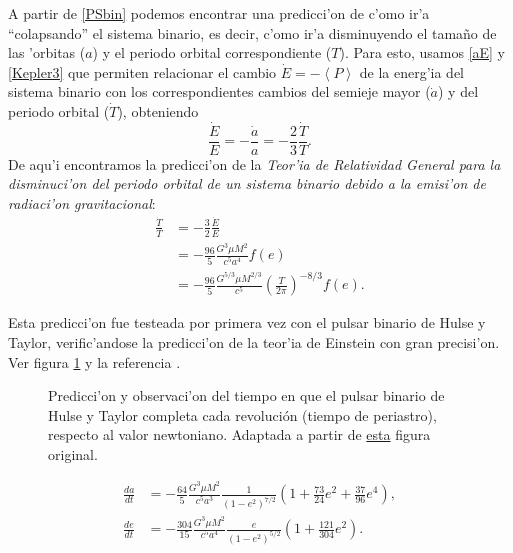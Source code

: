 A partir de \eqref{PSbin} podemos encontrar una predicci'on de c'omo ir'a ``colapsando'' el sistema binario, es decir, c'omo ir'a disminuyendo el tama\~no de las 'orbitas ($a$) y el periodo orbital correspondiente ($T$). Para esto, usamos \eqref{aE} y \eqref{Kepler3} que permiten relacionar el cambio $\dot{E}=-\left\langle P\right\rangle$ de la energ'ia del sistema binario con los correspondientes cambios del semieje mayor ($\dot{a}$) y del periodo orbital ($\dot{T}$), obteniendo
\begin{equation}
\frac{\dot{E}}{E}=-\frac{\dot{a}}{a}=-\frac{2}{3}\frac{\dot{T}}{T}.
\end{equation}
De aqu'i encontramos la predicci'on de la \textit{Teor'ia de Relatividad General para la disminuci'on del periodo orbital de un sistema binario debido a la emisi'on de radiaci'on gravitacional}:
\begin{align}
\frac{\dot{T}}{T} &= -\frac{3}{2}\frac{\dot{E}}{E} \\
&= -\frac{96}{5} \frac{G^3\mu M^2}{c^5a^4}f(e) \\
&= -\frac{96}{5} \frac{G^{5/3}\mu M^{2/3}}{c^5}\left(\frac{T}{2\pi}\right)^{-8/3}f(e).
\end{align}

Esta predicci'on fue testeada por primera vez con el pulsar binario de Hulse y Taylor, verific'andose la predicci'on de la teor'ia de Einstein con gran precisi'on. Ver figura \ref{fig:HT} y la referencia \cite{WT05}.
\begin{center}
\begin{figure}[H]
\centerline{}
\caption{Predicci'on y observaci'on del tiempo en que el pulsar binario de Hulse y Taylor completa cada revolución (tiempo de periastro), respecto al valor newtoniano. Adaptada a partir de \href{http://en.wikipedia.org/wiki/File:PSR_B1913\%2B16_period_shift_graph.svg}{esta} figura original.}
\label{fig:HT}
\end{figure}
\end{center}

\begin{align}
\frac{da}{dt} &= -\frac{64}{5}\frac{G^3\mu M^2}{c^5a^3}\frac{1}{\left(1-e^2\right)^{7/2}}\left(1+\frac{73}{24}e^2+\frac{37}{96}e^4\right) ,\\
\frac{de}{dt} &= -\frac{304}{15}\frac{G^3\mu M^2}{c^5a^4}\frac{e}{\left(1-e^2\right)^{5/2}}\left(1+\frac{121}{304}e^2\right).
\end{align}

